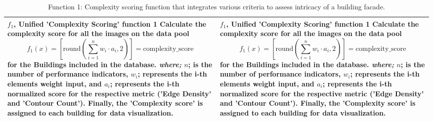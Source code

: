 \documentclass[final,5p,times]{elsarticle}
\begin{document}
\begin{table}[htb]
\centering
\caption{Function 1: Complexity scoring function that integrates various criteria to assess intricacy of a building facade.}
\label{tab:ComplexityScoreFunction_table}
\begin{tabularx}{\textwidth}{|X|X|}%
\hline
\small
\textbf{\(f_1\), Unified 'Complexity Scoring' function 1}
\newline
Calculate the complexity score for all the images on the data pool
\begin{equation}
    f_1(x) = \left[ \mathrm{round}\left(\sum_{i=1}^{n} w_i \cdot a_i, 2\right) \right] = \text{complexity\_score}
\label{eq:F1_ComplexityScoreFunction}
\end{equation}
for the Buildings included in the database.
\newline
\textit{where;}
\newline
\(n \); is the number of performance indicators,
\newline
\(w_i \); represents the i-th elements weight input, and
\newline
\(a_i \); represents the i-th normalized score for the respective metric ('Edge Density' and 'Contour Count').
\newline
Finally, the 'Complexity score' is assigned to each building for data visualization.
&
\small
\textbf{\(f_1\), Unified 'Complexity Scoring' function 1}
\newline
Calculate the complexity score for all the images on the data pool
\begin{equation}
    f_1(x) = \left[ \mathrm{round}\left(\sum_{i=1}^{n} w_i \cdot a_i, 2\right) \right] = \text{complexity\_score}
\label{eq:F1_ComplexityScoreFunction}
\end{equation}
for the Buildings included in the database.
\newline
\textit{where;}
\newline
\(n \); is the number of performance indicators,
\newline
\(w_i \); represents the i-th elements weight input, and
\newline
\(a_i \); represents the i-th normalized score for the respective metric ('Edge Density' and 'Contour Count').
\newline
Finally, the 'Complexity score' is assigned to each building for data visualization.
\\
\hline
\end{tabularx}
\end{table}
\end{document}
